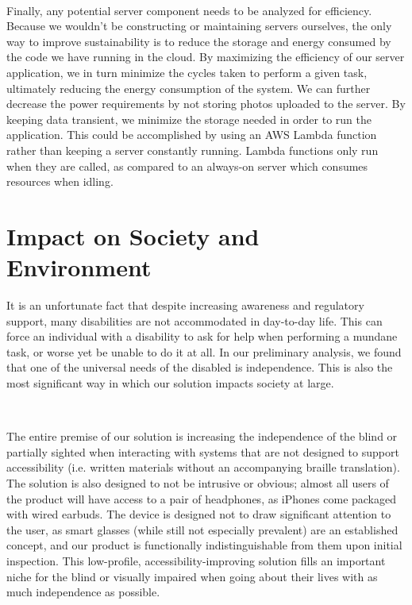 \documentclass[a4paper,11pt]{article}
\begin{document}
\

\noindent
Finally, any potential server component needs to be analyzed for efficiency. Because we wouldn't be constructing or maintaining servers ourselves, the only way to improve sustainability is to reduce the storage and energy consumed by the code we have running in the cloud. By maximizing the efficiency of our server application, we in turn minimize the cycles taken to perform a given task, ultimately reducing the energy consumption of the system. We can further decrease the power requirements by not storing photos uploaded to the server. By keeping data transient, we minimize the storage needed in order to run the application. This could be accomplished by using an AWS Lambda function rather than keeping a server constantly running. Lambda functions only run when they are called, as compared to an always-on server which consumes resources when idling.

\newpage
\section{Impact on Society and Environment}
\noindent
It is an unfortunate fact that despite increasing awareness and regulatory support, many disabilities are not accommodated in day-to-day life. This can force an individual with a disability to ask for help when performing a mundane task, or worse yet be unable to do it at all. In our preliminary analysis, we found that one of the universal needs of the disabled is independence. This is also the most significant way in which our solution impacts society at large.


\

\noindent
The entire premise of our solution is increasing the independence of the blind or partially sighted when interacting with systems that are not designed to support accessibility (i.e. written materials without an accompanying braille translation). The solution is also designed to not be intrusive or obvious; almost all users of the product will have access to a pair of headphones, as iPhones come packaged with wired earbuds. The device is designed not to draw significant attention to the user, as smart glasses (while still not especially prevalent) are an established concept, and our product is functionally indistinguishable from them upon initial inspection. This low-profile, accessibility-improving solution fills an important niche for the blind or visually impaired when going about their lives with as much independence as possible.
\end{document}
